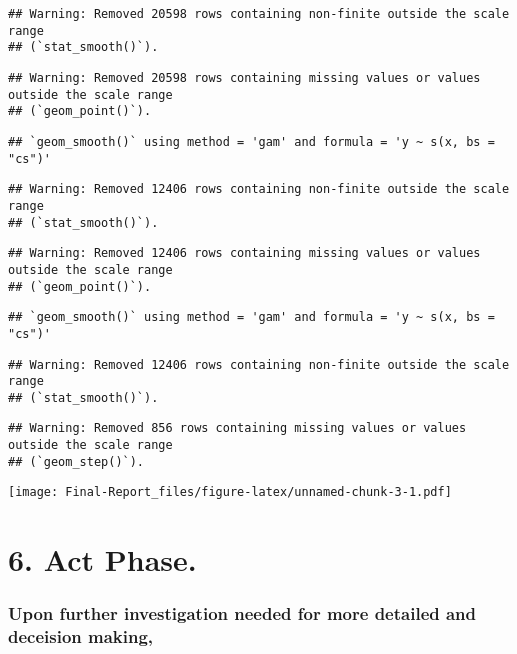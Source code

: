\documentclass[
]{article}
\begin{document}
\begin{verbatim}
## Warning: Removed 20598 rows containing non-finite outside the scale range
## (`stat_smooth()`).
\end{verbatim}

\begin{verbatim}
## Warning: Removed 20598 rows containing missing values or values outside the scale range
## (`geom_point()`).
\end{verbatim}

\begin{verbatim}
## `geom_smooth()` using method = 'gam' and formula = 'y ~ s(x, bs = "cs")'
\end{verbatim}

\begin{verbatim}
## Warning: Removed 12406 rows containing non-finite outside the scale range
## (`stat_smooth()`).
\end{verbatim}

\begin{verbatim}
## Warning: Removed 12406 rows containing missing values or values outside the scale range
## (`geom_point()`).
\end{verbatim}

\begin{verbatim}
## `geom_smooth()` using method = 'gam' and formula = 'y ~ s(x, bs = "cs")'
\end{verbatim}

\begin{verbatim}
## Warning: Removed 12406 rows containing non-finite outside the scale range
## (`stat_smooth()`).
\end{verbatim}

\begin{verbatim}
## Warning: Removed 856 rows containing missing values or values outside the scale range
## (`geom_step()`).
\end{verbatim}

\texttt{[image: Final-Report\_files/figure-latex/unnamed-chunk-3-1.pdf]}

\section{6. Act Phase.}\label{act-phase.}

\subsubsection{Upon further investigation needed for more detailed and
deceision
making,}\label{upon-further-investigation-needed-for-more-detailed-and-deceision-making}
\end{document}
